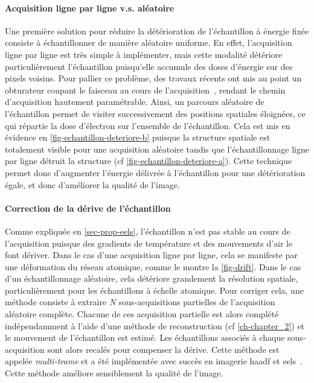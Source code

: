     \paragraph{Acquisition ligne par ligne v.s. aléatoire} Une première solution pour réduire la détérioration de l'échantillon à énergie fixée consiste à échantillonner de manière aléatoire uniforme. En effet, l'acquisition ligne par ligne est très simple à implémenter, mais cette modalité détériore particulièrement l'échantillon puisqu'elle accumule des doses d'énergie sur des pixels voisins. Pour pallier ce problème, des travaux récents ont mis au point un obturateur coupant le faisceau au cours de l'acquisition~\cite{beche2016development, tararan2016random}, rendant le chemin d'acquisition hautement paramétrable. Ainsi, un parcours aléatoire de l'échantillon permet de visiter successivement des positions spatiales éloignées, ce qui répartie la dose d'électron sur l'ensemble de l'échantillon. Cela est mis en évidence en \cref{fig-echantillon-deteriore-b} puisque la structure spatiale est totalement visible pour une acquisition aléatoire tandis que l'échantillonnage ligne par ligne détruit la structure (cf \cref{fig-echantillon-deteriore-a}). Cette technique permet donc d'augmenter l'énergie délivrée à l'échantillon pour une détérioration égale, et donc d'améliorer la qualité de l'image.

    \paragraph{Correction de la dérive de l'échantillon} Comme expliquée en \cref{sec-prop-eels}, l'échantillon n'est pas stable au cours de l'acquisition puisque des gradients de température et des mouvements d'air le font dériver. Dans le cas d'une acquisition ligne par ligne, cela se manifeste par une déformation du réseau atomique, comme le montre la \cref{fig-drift}. Dans le cas d'un échantillonnage aléatoire, cela détériore grandement la résolution spatiale, particulièrement pour les échantillons à échelle atomique. Pour corriger cela, une méthode consiste à extraire $N$ sous-acquisitions partielles de l'acquisition aléatoire complète. Chacune de ces acquisition partielle est alors complété indépendamment à l'aide d'une méthode de reconstruction (cf \cref{ch-chapter_2}) et le mouvement de l'échantillon est estimé. Les échantillons associés à chaque sous-acquisition sont alors recalés pour compenser la dérive. Cette méthode est appelée \emph{multi-trame} et a été implémentée avec succès en imagerie \gls{haadf} et \gls{eels}~\cite{zobelli2019spatial}. Cette méthode améliore sensiblement la qualité de l'image.

